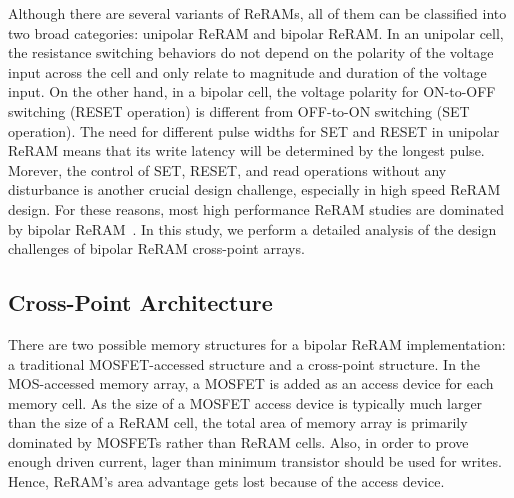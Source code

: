 Although there are several variants of ReRAMs, all of them can be classified into two broad categories: unipolar ReRAM and bipolar ReRAM. In an unipolar cell, the resistance switching behaviors do not depend on the polarity of the voltage input across the cell and only relate to magnitude and duration of the voltage input. On the other hand, in a bipolar cell, the voltage polarity for ON-to-OFF switching (RESET operation) is different from OFF-to-ON switching (SET operation). %
The need for different pulse widths for SET and RESET in unipolar ReRAM means that its write latency will be determined by the longest pulse. Morever, the control of SET, RESET, and read operations without any disturbance is another crucial design challenge, especially in high speed ReRAM design. %
For these reasons, most high performance ReRAM studies are dominated by bipolar ReRAM~\cite{ReRAM_IEDM2010_Kim,ReRAM_ISSCC2011_Sheu,ReRAM_ISSCC2011_Otsuka}.
In this study, we perform a detailed analysis of the design challenges of bipolar ReRAM cross-point arrays.

\subsection{Cross-Point Architecture}
There are two possible memory structures for a bipolar ReRAM implementation:
a traditional MOSFET-accessed structure and a cross-point structure. In the
MOS-accessed memory array, a MOSFET is added as an access device for each memory
cell. As the size of a MOSFET access device is typically much larger than the size
of a ReRAM cell, the total area of memory array is primarily dominated by MOSFETs
rather than ReRAM cells. Also, in order to prove enough driven current, lager than minimum transistor should be used for writes.
Hence, ReRAM's area advantage gets lost because of the access device. %

